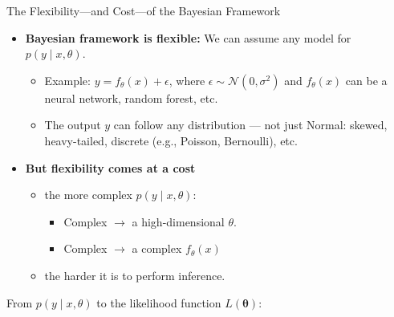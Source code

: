 \documentclass{beamer}
\begin{document}
\begin{frame}{The Flexibility—and Cost—of the Bayesian Framework}

\begin{itemize}
  \item \textbf{Bayesian framework is flexible:}
  We can assume any model for $p(y \mid x, \theta)$.
  \begin{itemize}
    \item Example: $y = f_\theta(x) + \epsilon$, where $\epsilon \sim \mathcal{N}(0, \sigma^2)$
    and $f_\theta(x)$ can be a neural network, random forest, etc.
    \item The output $y$ can follow any distribution — not just Normal:
    skewed, heavy-tailed, discrete (e.g., Poisson, Bernoulli), etc.
  \end{itemize}

\item \textbf{But flexibility comes at a cost}
  \begin{itemize}
    \item the more complex $p(y \mid x, \theta)$:
      \begin{itemize}
      \item Complex $\rightarrow$ a high-dimensional $\theta$.
      \item Complex $\rightarrow$ a complex $f_\theta(x)$
      \end{itemize}
    \item the harder it is to perform inference.
    \end{itemize}
  \end{itemize}

\end{frame}

\begin{frame}
  From $p(y \mid x, \theta)$ to the likelihood function $L(\bm{\theta})$:
  \end{frame}
\end{document}
